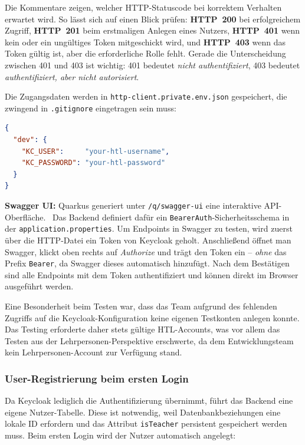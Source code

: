 Die Kommentare zeigen, welcher HTTP-Statuscode bei korrektem Verhalten
erwartet wird. So lässt sich auf einen Blick prüfen:
\textbf{HTTP~200} bei erfolgreichem Zugriff,
\textbf{HTTP~201} beim erstmaligen Anlegen eines Nutzers,
\textbf{HTTP~401} wenn kein oder ein ungültiges Token mitgeschickt
wird, und \textbf{HTTP~403} wenn das Token gültig ist, aber die
erforderliche Rolle fehlt. Gerade die Unterscheidung zwischen 401
und 403 ist wichtig: 401 bedeutet \textit{nicht authentifiziert},
403 bedeutet \textit{authentifiziert, aber nicht autorisiert}.

Die Zugangsdaten werden in \texttt{http-client.private.env.json}
gespeichert, die zwingend in \texttt{.gitignore} eingetragen sein
muss:

\begin{lstlisting}[language=json,
                   caption={http-client.private.env.json (nicht ins Repository)},
                   label={lst:http-client-env}]
{
  "dev": {
    "KC_USER":     "your-htl-username",
    "KC_PASSWORD": "your-htl-password"
  }
}
\end{lstlisting}

\textbf{Swagger UI:} Quarkus generiert unter \texttt{/q/swagger-ui}
eine interaktive API-Oberfläche.~\cite{quarkus-security-jwt} Das
Backend definiert dafür ein \texttt{BearerAuth}-Sicherheitsschema in
der 
\texttt{application.properties}. Um Endpoints in Swagger zu
testen, wird zuerst über die HTTP-Datei ein Token von Keycloak geholt.
Anschließend öffnet man Swagger, klickt oben rechts auf
\textit{Authorize} und trägt den Token ein -- \textit{ohne} das Prefix
\texttt{Bearer}, da Swagger dieses automatisch hinzufügt. Nach dem
Bestätigen sind alle Endpoints mit dem Token authentifiziert und
können direkt im Browser ausgeführt werden.

Eine Besonderheit beim Testen war, dass das Team aufgrund des fehlenden
Zugriffs auf die Keycloak-Konfiguration keine eigenen Testkonten anlegen
konnte. Das Testing erforderte daher stets gültige HTL-Accounts, was
vor allem das Testen aus der Lehrpersonen-Perspektive erschwerte, da
dem Entwicklungsteam kein Lehrpersonen-Account zur Verfügung stand.

\subsubsection{User-Registrierung beim ersten Login}

Da Keycloak lediglich die Authentifizierung übernimmt, führt das
Backend eine eigene Nutzer-Tabelle. Diese ist notwendig, weil
Datenbankbeziehungen eine lokale ID erfordern und das Attribut
\texttt{isTeacher} persistent gespeichert werden muss. Beim ersten
Login wird der Nutzer automatisch angelegt:

